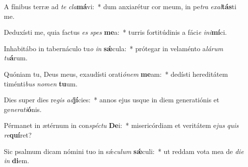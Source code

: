 \item A fínibus terræ ad \textit{te} \textit{cla}\textbf{má}vi:~* dum anxiarétur cor meum, in pe\textit{tra} \textit{ex}\textit{al}\textbf{tás}ti me.
\item Deduxísti me, quia factus \textit{es} \textit{spes} \textbf{me}a:~* turris fortitúdinis a fáci\textit{e} \textit{in}\textit{i}\textbf{mí}ci.
\item Inhabitábo in tabernáculo tu\textit{o} \textit{in} \textbf{sǽ}cula:~* prótegar in velaménto a\textit{lá}\textit{rum} \textit{tu}\textbf{á}rum.
\item Quóniam tu, Deus meus, exaudísti orati\textit{ó}\textit{nem} \textbf{me}am:~* dedísti hereditátem timénti\textit{bus} \textit{no}\textit{men} \textbf{tu}um.
\item Dies super dies re\textit{gis} \textit{ad}\textbf{jí}cies:~* annos ejus usque in diem generatiónis et ge\textit{ne}\textit{ra}\textit{ti}\textbf{ó}nis.
\item Pérmanet in ætérnum in con\textit{spéc}\textit{tu} \textbf{De}i:~* misericórdiam et veritátem e\textit{jus} \textit{quis} \textit{re}\textbf{quí}ret?
\item Sic psalmum dicam nómini tuo in sǽ\textit{cu}\textit{lum} \textbf{sǽ}culi:~* ut reddam vota mea de \textit{di}\textit{e} \textit{in} \textbf{di}em.
